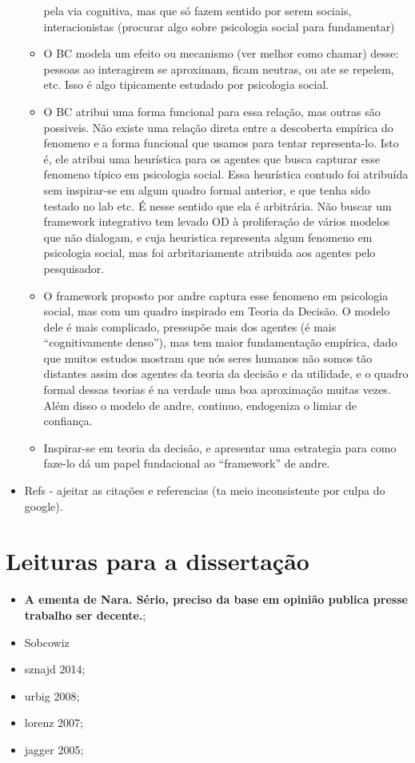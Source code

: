 \documentclass{article}
\begin{document}
\begin{itemize}
\begin{itemize}
    pela via cognitiva, mas que só fazem sentido por serem sociais,
    interacionistas (procurar algo sobre psicologia social para fundamentar)
  \item O BC modela um efeito ou mecanismo (ver melhor como chamar) desse:
    pessoas ao interagirem se aproximam, ficam neutras, ou ate se repelem, etc.
    Isso é algo tipicamente estudado por psicologia social.
  \item O BC atribui uma forma funcional para essa relação, mas outras são
    possiveis. Não existe uma relação direta entre a descoberta empírica do
    fenomeno e a forma funcional que usamos para tentar representa-lo. Isto é,
    ele atribui uma heurística para os agentes que busca capturar esse fenomeno
    típico em psicologia social. Essa heurística contudo foi atribuída sem
    inspirar-se em algum quadro formal anterior, e que tenha sido testado no lab
    etc. É nesse sentido que ela é arbitrária. Não buscar um framework
    integrativo tem levado OD à proliferação de vários modelos que não dialogam,
    e cuja heuristica representa algum fenomeno em psicologia social, mas foi
    arbritariamente atribuida aos agentes pelo pesquisador.
  \item O framework proposto por andre captura esse fenomeno em psicologia
    social, mas com um quadro inspirado em Teoria da Decisão.  O modelo dele é
    mais complicado, pressupõe mais dos agentes (é mais ``cognitivamente
    denso''), mas tem maior fundamentação empírica, dado que muitos estudos
    mostram que nós seres humanos não somos tão distantes assim dos agentes da
    teoria da decisão e da utilidade, e o quadro formal dessas teorias é na
    verdade uma boa aproximação muitas vezes. Além disso o modelo de andre,
    continuo, endogeniza o limiar de confiança.
  \item Inspirar-se em teoria da decisão, e apresentar uma estrategia para como
    faze-lo dá um papel fundacional ao ``framework'' de andre.
  \end{itemize}
\item {\Large Refs - ajeitar as citações e referencias (ta meio inconsistente
    por culpa do google)}.

\end{itemize}

\section*{Leituras para a dissertação}

\begin{itemize}
\item {\Large \textbf{A ementa de Nara. Sério, preciso da base em opinião
      publica presse trabalho ser decente.};}
\item Sobcowiz
\item sznajd 2014;
\item urbig 2008; 
\item lorenz 2007;
\item jagger 2005;
\end{itemize}
\end{document}
